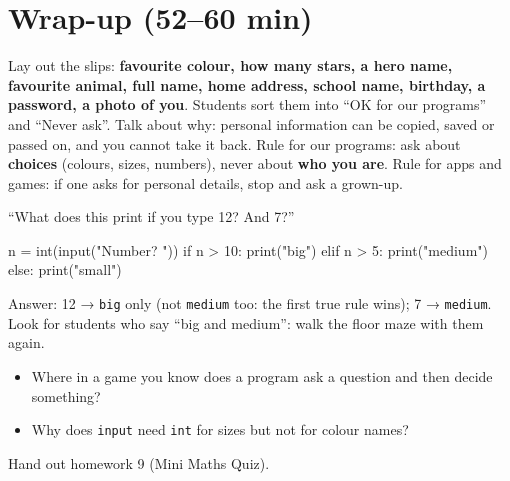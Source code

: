 \section{Wrap-up (52--60 min)}
\begin{safety}
Lay out the slips: \textbf{favourite colour, how many stars, a hero name, favourite animal, full name, home address, school name, birthday, a password, a photo of you}. Students sort them into \enquote{OK for our programs} and \enquote{Never ask}. Talk about why: personal information can be copied, saved or passed on, and you cannot take it back. Rule for our programs: ask about \textbf{choices} (colours, sizes, numbers), never about \textbf{who you are}. Rule for apps and games: if one asks for personal details, stop and ask a grown-up.
\end{safety}
\begin{formativecheck}
\enquote{What does this print if you type 12? And 7?}
\begin{pycode}
n = int(input("Number? "))
if n > 10:
    print("big")
elif n > 5:
    print("medium")
else:
    print("small")
\end{pycode}
Answer: 12 → \texttt{big} only (not \texttt{medium} too: the first true rule wins); 7 → \texttt{medium}. Look for students who say \enquote{big and medium}: walk the floor maze with them again.
\end{formativecheck}
\begin{reflection}
\begin{itemize}[leftmargin=1.2em,itemsep=1pt]
  \item Where in a game you know does a program ask a question and then decide something?
  \item Why does \texttt{input} need \texttt{int} for sizes but not for colour names?
\end{itemize}
Hand out homework 9 (Mini Maths Quiz).
\end{reflection}


